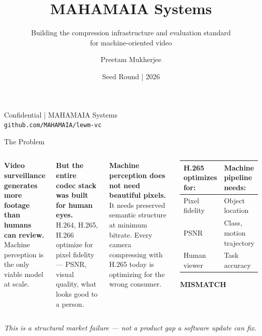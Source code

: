 \documentclass[aspectratio=169, professionalfonts, 10pt]{beamer}
\title{MAHAMAIA Systems}
\subtitle{Building the compression infrastructure and evaluation standard\\for machine-oriented video}
\author{Preetam Mukherjee}
\institute{preetam@mahamaia.com}
\date{Seed Round | 2026}
\begin{document}
\begin{frame}[plain]
  \maketitle
  \vspace{1em}
  \begin{center}
    \small
    Confidential | MAHAMAIA Systems \\
    \texttt{github.com/MAHAMAIA/lewm-vc}
  \end{center}
\end{frame}

\begin{frame}{The Problem}

  \begin{columns}
    \textbf{Video surveillance generates more footage than humans can review.} \\
    Machine perception is the only viable model at scale.

    \bigskip
    \textbf{But the entire codec stack was built for human eyes.} \\
    H.264, H.265, H.266 optimize for pixel fidelity --- PSNR, visual quality, what looks good to a person.

    \bigskip
    \textbf{Machine perception does not need beautiful pixels.} \\
    It needs preserved semantic structure at minimum bitrate. Every camera compressing with H.265 today is optimizing for the wrong consumer.

    \begin{center}
    \begin{tabular}{@{}ll@{}}
      \toprule
      \textbf{H.265 optimizes for:} & \textbf{Machine pipeline needs:} \\
      \midrule
      Pixel fidelity    & Object location \\
      PSNR              & Class, motion trajectory \\
      Human viewer      & Task accuracy \\
      \bottomrule
    \end{tabular}
    \vspace{0.3em}
    {\color{red}\textbf{MISMATCH}}
    \end{center}
  \end{columns}

  \vspace{0.5em}
  \begin{center}
    \textit{This is a structural market failure --- not a product gap a software update can fix.}
  \end{center}
\end{frame}
\end{document}
